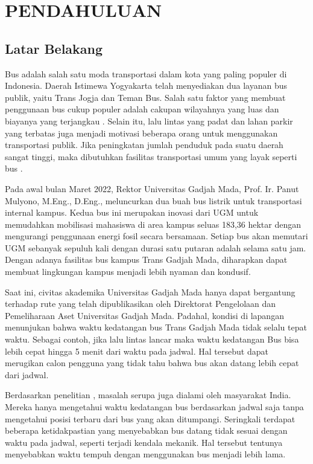 \chapter{PENDAHULUAN}

\section{Latar Belakang}
Bus adalah salah satu moda transportasi dalam kota yang paling populer di Indonesia. Daerah Istimewa Yogyakarta telah menyediakan dua layanan bus publik, yaitu Trans Jogja dan Teman Bus. Salah satu faktor yang membuat penggunaan bus cukup populer adalah cakupan wilayahnya yang luas dan biayanya yang terjangkau \cite{Rohani2013}. Selain itu, lalu lintas yang padat dan lahan parkir yang terbatas juga menjadi motivasi beberapa orang untuk menggunakan transportasi publik. Jika peningkatan jumlah penduduk pada suatu daerah sangat tinggi, maka dibutuhkan fasilitas transportasi umum yang layak seperti bus \cite{Sutandi2015}.

Pada awal bulan Maret 2022, Rektor Universitas Gadjah Mada, Prof. Ir. Panut Mulyono, M.Eng., D.Eng., meluncurkan dua buah bus listrik untuk transportasi internal kampus. Kedua bus ini merupakan inovasi dari UGM untuk memudahkan mobilisasi mahasiswa di area kampus seluas 183,36 hektar dengan mengurangi penggunaan energi fosil secara bersamaan. Setiap bus akan memutari UGM sebanyak sepuluh kali dengan durasi satu putaran adalah selama satu jam. Dengan adanya fasilitas bus kampus Trans Gadjah Mada, diharapkan dapat membuat lingkungan kampus menjadi lebih nyaman dan kondusif.

Saat ini, civitas akademika Universitas Gadjah Mada hanya dapat bergantung terhadap rute yang telah dipublikasikan oleh Direktorat Pengelolaan dan Pemeliharaan Aset Universitas Gadjah Mada. Padahal, kondisi di lapangan menunjukan bahwa waktu kedatangan bus Trans Gadjah Mada tidak selalu tepat waktu. Sebagai contoh, jika lalu lintas lancar maka waktu kedatangan Bus bisa lebih cepat hingga 5 menit dari waktu pada jadwal. Hal tersebut dapat merugikan calon pengguna yang tidak tahu bahwa bus akan datang lebih cepat dari jadwal.

Berdasarkan penelitian \cite{Sutar2016}, masalah serupa juga dialami oleh masyarakat India. Mereka hanya mengetahui waktu kedatangan bus berdasarkan jadwal saja tanpa mengetahui posisi terbaru dari bus yang akan ditumpangi. Seringkali terdapat beberapa ketidakpastian yang menyebabkan bus datang tidak sesuai dengan waktu pada jadwal, seperti terjadi kendala mekanik. Hal tersebut tentunya menyebabkan waktu tempuh dengan menggunakan bus menjadi lebih lama.

